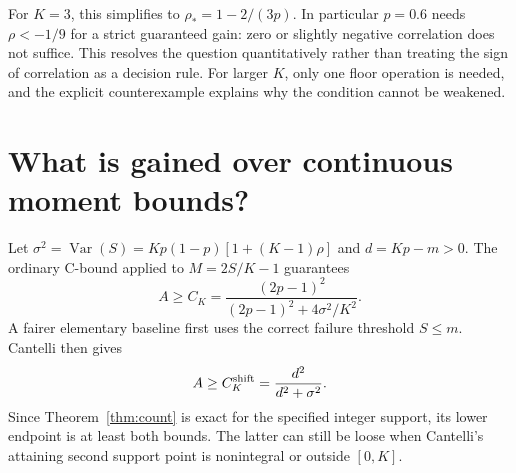 \documentclass{article}
\begin{document}
For $K=3$, this simplifies to $\rho_*=1-2/(3p)$. In particular $p=0.6$ needs $\rho<-1/9$ for a strict guaranteed gain: zero or slightly negative correlation does not suffice. This resolves the question quantitatively rather than treating the sign of correlation as a decision rule. For larger $K$, only one floor operation is needed, and the explicit counterexample explains why the condition cannot be weakened.

\clearpage
\section{What is gained over continuous moment bounds?}
Let $\sigma^2=\operatorname{Var}(S)=Kp(1-p)[1+(K-1)\rho]$ and $d=Kp-m>0$.
The ordinary C-bound applied to $M=2S/K-1$ guarantees
\begin{equation}\label{eq:c_bound}
 A\ge C_K=\frac{(2p-1)^2}{(2p-1)^2+4\sigma^2/K^2}.
\end{equation}
A fairer elementary baseline first uses the correct failure threshold $S\le m$. Cantelli then gives
\begin{equation}\label{eq:shifted}
 A\ge C_K^{\rm shift}=\frac{d^2}{d^2+\sigma^2}.
\end{equation}
Since Theorem~\ref{thm:count} is exact for the specified integer support, its lower endpoint is at least both bounds. The latter can still be loose when Cantelli's attaining second support point is nonintegral or outside $[0,K]$.
\end{document}
